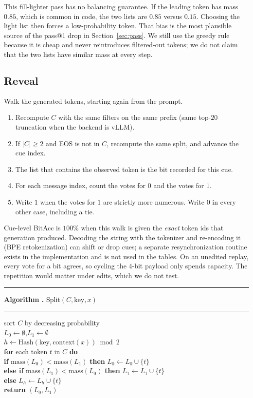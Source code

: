\documentclass[11pt]{article}
\newcounter{algo}
\newcommand{\alghead}[2]{%
  \par\vspace{0.55em}\noindent
  \begin{minipage}{\columnwidth}
  \hrule\vspace{0.4em}
  \refstepcounter{algo}\label{#1}%
  {\small\textbf{Algorithm \thealgo.} #2}\par
  \vspace{0.15em}\hrule\vspace{0.35em}
  \small
}
\begin{document}
This fill-lighter pass has no balancing guarantee.
If the leading token has mass $0.85$, which is common in code, the two lists are $0.85$ versus $0.15$.
Choosing the light list then forces a low-probability token.
That bias is the most plausible source of the pass@1 drop in Section~\ref{sec:pass}.
We still use the greedy rule because it is cheap and never reintroduces filtered-out tokens; we do not claim that the two lists have similar mass at every step.

\subsection{Reveal}
\label{sec:reveal}

Walk the generated tokens, starting again from the prompt.

\begin{enumerate}
\item Recompute $C$ with the same filters on the same prefix (same top-$20$ truncation when the backend is vLLM).
\item If $|C|\ge 2$ and EOS is not in $C$, recompute the same split, and advance the cue index.
\item The list that contains the observed token is the bit recorded for this cue.
\item For each message index, count the votes for $0$ and the votes for $1$.
\item Write $1$ when the votes for $1$ are strictly more numerous. Write $0$ in every other case, including a tie.
\end{enumerate}

Cue-level BitAcc is $100\%$ when this walk is given the \emph{exact} token ids that generation produced.
Decoding the string with the tokenizer and re-encoding it (BPE retokenization) can shift or drop cues; a separate resynchronization routine exists in the implementation and is not used in the tables.
On an unedited replay, every vote for a bit agrees, so cycling the $4$-bit payload only spends capacity.
The repetition would matter under edits, which we do not test.

\alghead{alg:split}{Split$(C, \mathrm{key}, x)$}
\noindent
sort $C$ by decreasing probability\\
$L_0 \leftarrow \emptyset$,\quad $L_1 \leftarrow \emptyset$\\
$h \leftarrow \mathrm{Hash}(\mathrm{key}, \mathrm{context}(x)) \bmod 2$\\
\textbf{for} each token $t$ in $C$ \textbf{do}\\
\hspace*{1em}\textbf{if} $\mathrm{mass}(L_0) < \mathrm{mass}(L_1)$ \textbf{then} $L_0 \leftarrow L_0 \cup \{t\}$\\
\hspace*{1em}\textbf{else if} $\mathrm{mass}(L_1) < \mathrm{mass}(L_0)$ \textbf{then} $L_1 \leftarrow L_1 \cup \{t\}$\\
\hspace*{1em}\textbf{else} $L_h \leftarrow L_h \cup \{t\}$\\
\textbf{return} $(L_0, L_1)$
\end{minipage}
\end{document}
